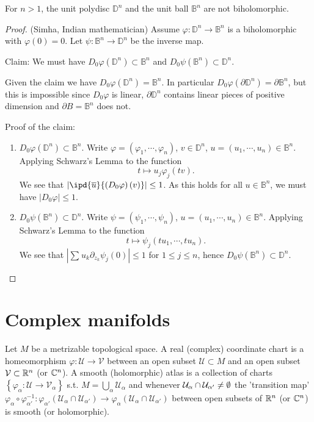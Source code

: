 \begin{theorem}[Poincar\'{e}]
 For $n>1$, the unit polydisc $\mathbb{D}^{n}$ and the unit ball $\mathbb{B}^{n}$ are not biholomorphic. 
\end{theorem}
\begin{proof}
  (Simha, Indian mathematician) Assume $\varphi:\mathbb{D}^{n}\to \mathbb{B}^{n}$ is a biholomorphic with $\varphi(0)=0$. Let $\psi:\mathbb{B}^{n}\to \mathbb{D}^{n}$ be the inverse map. 

  Claim: We must have $D_0\varphi(\mathbb{D}^{n})\subset \mathbb{B}^{n}$ and $D_0 \psi(\mathbb{B}^{n})\subset \mathbb{D}^{n}$. 
  
  Given the claim we have $D_0\varphi(\mathbb{D}^{n})=\mathbb{B}^{n}$. In particular $D_0\varphi(\partial \mathbb{D}^{n})=\partial \mathbb{B}^{n}$, but this is impossible since $D_0\varphi$ is linear, $\partial \mathbb{D}^{n}$ contains linear pieces of positive dimension and $\partial B=\mathbb{B}^{n}$ does not.

  Proof of the claim: 
  \begin{enumerate}
    \item $D_0\varphi(\mathbb{D}^{n})\subset  \mathbb{B}^{n}$. Write $\varphi=\left( \varphi_1,\cdots ,\varphi_n \right) $, $v\in \mathbb{D}^{n}$, $u=(u_1,\cdots ,u_n)\in  \mathbb{B}^{n}$. Applying Schwarz's Lemma to the function
      \[
	t\mapsto u_j\varphi_{j}(tv).
      \] 
      We see that $|\ipd{\overline{u}}{\left( D_0\varphi \right)(v) }|\le 1$. As this holds for all $u \in \mathbb{B}^{n}$, we must have $|D_0 \varphi|\le 1$.
    \item $D_0 \psi(\mathbb{B}^{n})\subset \mathbb{D}^{n}$. Write $\psi=\left( \psi_1,\cdots ,\psi_n \right) $, $u=\left( u_1,\cdots ,u_n \right) \in \mathbb{B}^{n}$. Applying Schwarz's Lemma to the function 
      \[
	t\mapsto \psi_j\left( tu_1,\cdots ,tu_n \right) .
      \] 
      We see that $|\sum_{}^{} u_k \partial_{z_k}\psi_j(0)|\le 1$ for $1\le j\le n$, hence $D_0\psi(\mathbb{B}^{n})\subset \mathbb{D}^{n}$.
  \end{enumerate}
\end{proof}

\section{Complex manifolds}
\begin{definition}
  Let $M$ be a metrizable topological space. A real (complex) coordinate chart is a homeomorphism $\varphi:\mathcal{U}\to \mathcal{V}$ between an open subset $\mathcal{U}\subset M$ and an open subset $\mathcal{V}\subset \mathbb{R}^{n}$ (or $\mathbb{C}^{n}$). A smooth (holomorphic) atlas is a collection of charts $\left\{\varphi_\alpha:\mathcal{U}\to \mathcal{V}_\alpha\right\} $ s.t. $M=\bigcup_{\alpha} \mathcal{U}_\alpha$ and whenever $\mathcal{U}_\alpha \cap \mathcal{U}_{\alpha'}\neq \emptyset$ the 'transition map' $\varphi_\alpha\circ \varphi_{\alpha'}^{-1}:\varphi_{\alpha'}\left( \mathcal{U}_\alpha \cap \mathcal{U}_{\alpha'} \right) \to \varphi_\alpha \left( \mathcal{U}_\alpha \cap \mathcal{U}_{\alpha'} \right) $ between open subsets of $\mathbb{R}^{n}$ (or $\mathbb{C}^{n}$) is smooth (or holomorphic). 
\end{definition}


